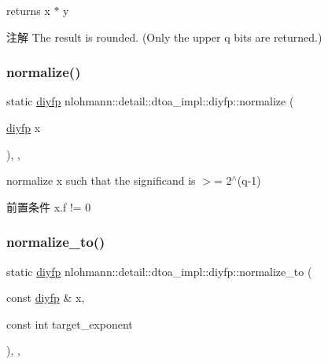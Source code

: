 returns x $\ast$ y 

\begin{DoxyNote}{注解}
The result is rounded. (Only the upper q bits are returned.) 
\end{DoxyNote}
\mbox{\label{structnlohmann_1_1detail_1_1dtoa__impl_1_1diyfp_a2246b5b40c7c6992153ef174063d6aa6}} 
\subsubsection{\texorpdfstring{normalize()}{normalize()}}
{\footnotesize\ttfamily static \mbox{\hyperlink{structnlohmann_1_1detail_1_1dtoa__impl_1_1diyfp}{diyfp}} nlohmann\+::detail\+::dtoa\+\_\+impl\+::diyfp\+::normalize (\begin{DoxyParamCaption}\item[{\mbox{\hyperlink{structnlohmann_1_1detail_1_1dtoa__impl_1_1diyfp}{diyfp}}}]{x }\end{DoxyParamCaption})\hspace{0.3cm}{\ttfamily [inline]}, {\ttfamily [static]}, {\ttfamily [noexcept]}}



normalize x such that the significand is $>$= 2$^\wedge$(q-\/1) 

\begin{DoxyPrecond}{前置条件}
x.\+f != 0 
\end{DoxyPrecond}
\mbox{\label{structnlohmann_1_1detail_1_1dtoa__impl_1_1diyfp_a6b6665e467ebabe0c0f7418d3fe4b118}} 
\subsubsection{\texorpdfstring{normalize\_to()}{normalize\_to()}}
{\footnotesize\ttfamily static \mbox{\hyperlink{structnlohmann_1_1detail_1_1dtoa__impl_1_1diyfp}{diyfp}} nlohmann\+::detail\+::dtoa\+\_\+impl\+::diyfp\+::normalize\+\_\+to (\begin{DoxyParamCaption}\item[{const \mbox{\hyperlink{structnlohmann_1_1detail_1_1dtoa__impl_1_1diyfp}{diyfp}} \&}]{x,  }\item[{const int}]{target\+\_\+exponent }\end{DoxyParamCaption})\hspace{0.3cm}{\ttfamily [inline]}, {\ttfamily [static]}, {\ttfamily [noexcept]}}



